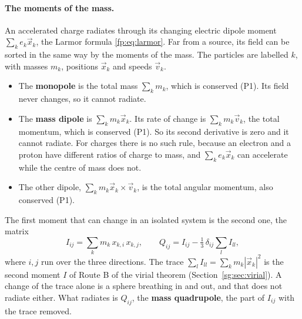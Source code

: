 \paragraph{The moments of the mass.} An accelerated charge radiates through its changing electric dipole moment $\sum_ke_k\vec x_k$, the Larmor formula \eqref{fp:eq:larmor}. Far from a source, its field can be sorted in the same way by the moments of the mass. The particles are labelled $k$, with masses $m_k$, positions $\vec x_k$ and speeds $\vec v_k$.
\begin{itemize}
	\item The \textbf{monopole} is the total mass $\sum_km_k$, which is conserved (P1). Its field never changes, so it cannot radiate.
	\item The \textbf{mass dipole} is $\sum_km_k\vec x_k$. Its rate of change is $\sum_km_k\vec v_k$, the total momentum, which is conserved (P1). So its second derivative is zero and it cannot radiate. For charges there is no such rule, because an electron and a proton have different ratios of charge to mass, and $\sum_ke_k\vec x_k$ can accelerate while the centre of mass does not.
	\item The other dipole, $\sum_km_k\vec x_k\times\vec v_k$, is the total angular momentum, also conserved (P1).
\end{itemize}
The first moment that can change in an isolated system is the second one, the matrix
\begin{equation}
	I_{ij}=\sum_km_k\,x_{k,i}\,x_{k,j},\qquad Q_{ij}=I_{ij}-\tfrac13\,\delta_{ij}\sum_lI_{ll},
	\label{cs:eq:Iij}
\end{equation}
where $i,j$ run over the three directions. The trace $\sum_lI_{ll}=\sum_km_k|\vec x_k|^2$ is the second moment $I$ of Route B of the virial theorem (Section~\ref{sg:sec:virial}). A change of the trace alone is a sphere breathing in and out, and that does not radiate either. What radiates is $Q_{ij}$, the \textbf{mass quadrupole}, the part of $I_{ij}$ with the trace removed.

